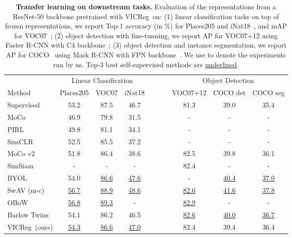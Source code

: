 \documentclass{article}
\newcommand{\algo}{VICReg}
\begin{document}
\begin{table}[t]
\centering
    \caption{\textbf{Transfer learning on downstream tasks.} Evaluation of the representations from a ResNet-50 backbone pretrained with \algo \ on: (1) linear classification tasks on top of frozen representations, we report Top-1 accuracy (in \%) for Places205 \cite{zhou2014places} and iNat18~\cite{vanhorni2018naturalist}, and mAP for VOC07~\cite{everingham2010voc}; (2) object detection with fine-tunning, we report AP for VOC07+12 using Faster R-CNN with C4 backbone~\cite{ren2015fasterrcnn}; (3) object detection and instance segmentation, we report AP for COCO~\cite{lin2014coco} using Mask R-CNN with FPN backbone~\cite{he2017maskrcnn}. We use  to denote the experiments run by us. Top-3 best self-supervised methods are \underline{underlined}.}
    \label{tab:transfer_learning}
    \vspace{-0.5em}
  \setlength{\tabcolsep}{2.0pt}
    \begin{tabular}{ @{} l ccc c ccc @{} }
      \toprule
       & \multicolumn{3}{c}{Linear Classification} &~~~~& \multicolumn{3}{c}{Object Detection}\\
\cmidrule{2-4}\cmidrule{6-8}
	   Method  & Places205 & VOC07 & iNat18 && VOC07+12 & COCO det & COCO seg \\
      \midrule
	    Supervised                          & 53.2  & 87.5 & 46.7 && 81.3 & 39.0 & 35.4 \\
      \midrule
	    MoCo~\cite{he2020moco}              & 46.9 & 79.8 & 31.5 && - & - & - \\
	    PIRL~\cite{misra2020pirl}           & 49.8 & 81.1 & 34.1 && - & - & - \\
	    SimCLR~\cite{chen2020simclr}        & 52.5 & 85.5 & 37.2 && - & - & -\\
	    MoCo v2~\cite{chen2020mocov2}       & 51.8 & 86.4 & 38.6 && 82.5 & 39.8 & 36.1 \\
	    SimSiam~\cite{chen2020simsiam}      & -      & -      & -      && 82.4 & - & - \\
	    BYOL~\cite{grill2020byol}           & 54.0 & \underline{86.6} & \underline{47.6} && - & \hspace{0.41em}\underline{40.4} & \hspace{0.41em}\underline{37.0} \\
	    SwAV (m-c)~\cite{caron2020swav}           & \underline{56.7} & \underline{88.9} & \underline{48.6} && \underline{82.6} & \underline{41.6} & \underline{37.8} \\
	    OBoW \cite{gidaris2021obow}         & \underline{56.8} & \underline{89.3} & -    && \underline{82.9} & - & - \\
	    Barlow Twins~\cite{grill2020byol}   & 54.1 & 86.2 & 46.5 && \underline{82.6} & \hspace{0.41em}\underline{40.0} & \hspace{0.41em}\underline{36.7} \\
\algo \ (ours)                      & \underline{54.3} & \underline{86.6} & \underline{47.0} && 82.4 & 39.4 & 36.4 \\
      \bottomrule
    \end{tabular}
\end{table}
\end{document}

